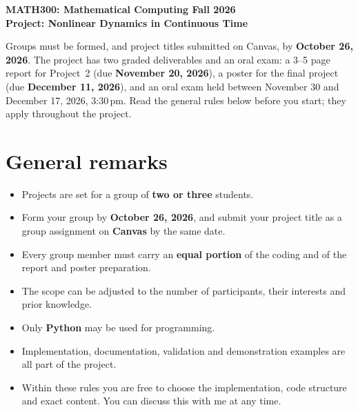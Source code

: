 \documentclass[11pt,a4paper]{article}
\begin{document}
\begin{center}
  {\large\bfseries MATH300: Mathematical Computing \textperiodcentered{} Fall 2026}\\[6pt]
  {\Large\bfseries Project: Nonlinear Dynamics in Continuous Time}
\end{center}
\vspace{6pt}

Groups must be formed, and project titles submitted on Canvas, by
\textbf{October 26, 2026}. The project
has two graded deliverables and an oral exam: a 3--5 page report for
Project~2 (due \textbf{November 20, 2026}), a poster for the final project
(due \textbf{December 11, 2026}), and an oral exam held between November 30
and December 17, 2026, 3:30\,pm. Read the general rules below before you
start; they apply throughout the project.

\section*{General remarks}
\begin{itemize}
  \item Projects are set for a group of \textbf{two or three} students.
  \item Form your group by \textbf{October 26, 2026}, and submit your
        project title as a group assignment on \textbf{Canvas} by the same
        date.
  \item Every group member must carry an \textbf{equal portion} of the coding
        and of the report and poster preparation.
  \item The scope can be adjusted to the number of participants, their
        interests and prior knowledge.
  \item Only \textbf{Python} may be used for programming.
  \item Implementation, documentation, validation and demonstration examples
        are all part of the project.
  \item Within these rules you are free to choose the implementation, code
        structure and exact content. You can discuss this with me at any time.
\end{itemize}
\end{document}
